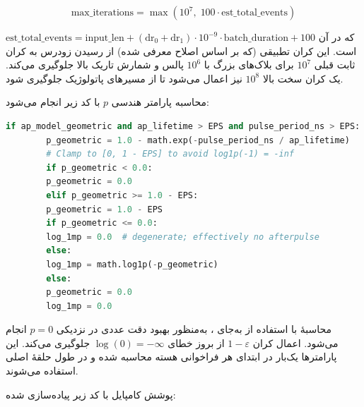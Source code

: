 \begin{equation}
	\text{max\_iterations} = \max\left(10^7,\; 100 \cdot \text{est\_total\_events}\right)
\end{equation}

که در آن $\text{est\_total\_events} = \text{input\_len} + (\text{dr}_0 + \text{dr}_1) \cdot 10^{-9} \cdot \text{batch\_duration} + 100$ است. این کران تطبیقی (که بر اساس اصلاح  معرفی شده) از رسیدن زودرس به کران ثابت قبلی $10^7$ برای بلاک‌های بزرگ با $10^6$ پالس و شمارش تاریک بالا جلوگیری می‌کند. یک کران سخت بالا $10^8$ نیز اعمال می‌شود تا از مسیرهای پاتولوژیک جلوگیری شود.

محاسبه پارامتر هندسی $p$ با کد زیر انجام می‌شود:

\begin{LTR}
	\begin{lstlisting}[language=Python]
		if ap_model_geometric and ap_lifetime > EPS and pulse_period_ns > EPS:
		p_geometric = 1.0 - math.exp(-pulse_period_ns / ap_lifetime)
		# Clamp to [0, 1 - EPS] to avoid log1p(-1) = -inf
		if p_geometric < 0.0:
		p_geometric = 0.0
		elif p_geometric >= 1.0 - EPS:
		p_geometric = 1.0 - EPS
		if p_geometric <= 0.0:
		log_1mp = 0.0  # degenerate; effectively no afterpulse
		else:
		log_1mp = math.log1p(-p_geometric)
		else:
		p_geometric = 0.0
		log_1mp = 0.0
	\end{lstlisting}
\end{LTR}

محاسبهٔ  با استفاده از  به‌جای ، به‌منظور بهبود دقت عددی در نزدیکی $p = 0$ انجام می‌شود. اعمال کران $1 - \varepsilon$ از بروز خطای $\log(0) = -\infty$ جلوگیری می‌کند. این پارامترها یک‌بار در ابتدای هر فراخوانی هسته محاسبه شده و در طول حلقهٔ اصلی استفاده می‌شوند.


پوشش کامپایل  با کد زیر پیاده‌سازی شده:

